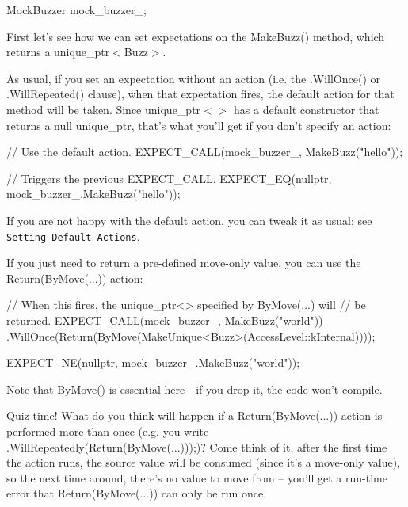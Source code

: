 \begin{DoxyCode}
MockBuzzer mock\_buzzer\_;
\end{DoxyCode}


First let’s see how we can set expectations on the {\ttfamily Make\+Buzz()} method, which returns a {\ttfamily unique\+\_\+ptr$<$Buzz$>$}.

As usual, if you set an expectation without an action (i.\+e. the {\ttfamily .Will\+Once()} or {\ttfamily .Will\+Repeated()} clause), when that expectation fires, the default action for that method will be taken. Since {\ttfamily unique\+\_\+ptr$<$$>$} has a default constructor that returns a null {\ttfamily unique\+\_\+ptr}, that’s what you’ll get if you don’t specify an action\+:


\begin{DoxyCode}
\textcolor{comment}{// Use the default action.}
EXPECT\_CALL(mock\_buzzer\_, MakeBuzz(\textcolor{stringliteral}{"hello"}));

\textcolor{comment}{// Triggers the previous EXPECT\_CALL.}
EXPECT\_EQ(\textcolor{keyword}{nullptr}, mock\_buzzer\_.MakeBuzz(\textcolor{stringliteral}{"hello"}));
\end{DoxyCode}


If you are not happy with the default action, you can tweak it as usual; see \href{#setting-the-default-actions-for-a-mock-method}{\tt Setting Default Actions}.

If you just need to return a pre-\/defined move-\/only value, you can use the {\ttfamily Return(By\+Move(...))} action\+:


\begin{DoxyCode}
\textcolor{comment}{// When this fires, the unique\_ptr<> specified by ByMove(...) will}
\textcolor{comment}{// be returned.}
EXPECT\_CALL(mock\_buzzer\_, MakeBuzz(\textcolor{stringliteral}{"world"}))
    .WillOnce(Return(ByMove(MakeUnique<Buzz>(AccessLevel::kInternal))));

EXPECT\_NE(\textcolor{keyword}{nullptr}, mock\_buzzer\_.MakeBuzz(\textcolor{stringliteral}{"world"}));
\end{DoxyCode}


Note that {\ttfamily By\+Move()} is essential here -\/ if you drop it, the code won’t compile.

Quiz time! What do you think will happen if a {\ttfamily Return(By\+Move(...))} action is performed more than once (e.\+g. you write {\ttfamily .Will\+Repeatedly(Return(By\+Move(...)));})? Come think of it, after the first time the action runs, the source value will be consumed (since it’s a move-\/only value), so the next time around, there’s no value to move from -- you’ll get a run-\/time error that {\ttfamily Return(By\+Move(...))} can only be run once.

